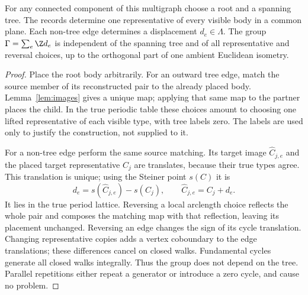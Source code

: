 \begin{lemma}
\label{lem:assembly}
For any connected component of this multigraph choose a root and a
spanning tree. The records determine one representative of every visible
body in a common plane. Each non-tree edge determines a displacement
$d_e\in\Lambda$. The group $\Gamma=\sum_e\Z d_e$ is independent of
the spanning tree and of all representative and reversal choices, up to
the orthogonal part of one ambient Euclidean isometry.
\end{lemma}
\begin{proof}
Place the root body arbitrarily. For an outward tree edge, match the
source member of its reconstructed pair to the already placed body.
Lemma~\ref{lem:images} gives a unique map; applying that same map to
the partner places the child. In the true periodic table these choices
amount to choosing one lifted representative of each visible type, with
tree labels zero. The labels are used only to justify the construction,
not supplied to it.

For a non-tree edge perform the same source matching. Its target image
$\widehat C_{j,e}$ and the placed target representative $C_j$ are
translates, because their true types agree. This translation is unique;
using the Steiner point $s(C)$ it is
\[
 d_e=s(\widehat C_{j,e})-s(C_j),\qquad
                         \widehat C_{j,e}=C_j+d_e.
\]
It lies in the true period lattice. Reversing a local arclength choice
reflects the whole pair and composes the matching map with that reflection,
leaving its placement unchanged. Reversing an edge changes the sign of
its cycle translation. Changing representative copies adds a vertex
coboundary to the edge translations; these differences cancel on closed
walks. Fundamental cycles generate all closed walks integrally. Thus
the group does not depend on the tree. Parallel repetitions either
repeat a generator or introduce a zero cycle, and cause no problem.
\end{proof}

